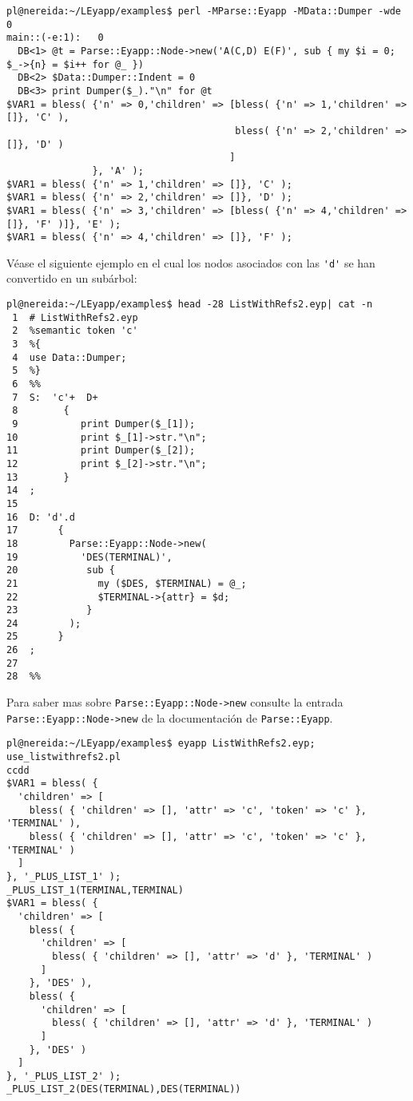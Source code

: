\begin{verbatim}
pl@nereida:~/LEyapp/examples$ perl -MParse::Eyapp -MData::Dumper -wde 0
main::(-e:1):   0
  DB<1> @t = Parse::Eyapp::Node->new('A(C,D) E(F)', sub { my $i = 0; $_->{n} = $i++ for @_ })
  DB<2> $Data::Dumper::Indent = 0
  DB<3> print Dumper($_)."\n" for @t
$VAR1 = bless( {'n' => 0,'children' => [bless( {'n' => 1,'children' => []}, 'C' ),
                                        bless( {'n' => 2,'children' => []}, 'D' )
                                       ]
               }, 'A' );
$VAR1 = bless( {'n' => 1,'children' => []}, 'C' );
$VAR1 = bless( {'n' => 2,'children' => []}, 'D' );
$VAR1 = bless( {'n' => 3,'children' => [bless( {'n' => 4,'children' => []}, 'F' )]}, 'E' );
$VAR1 = bless( {'n' => 4,'children' => []}, 'F' );
\end{verbatim}

Véase el siguiente ejemplo en el cual los nodos asociados con las \verb|'d'| se han convertido 
en un subárbol:
\begin{verbatim}
pl@nereida:~/LEyapp/examples$ head -28 ListWithRefs2.eyp| cat -n
 1  # ListWithRefs2.eyp
 2  %semantic token 'c'
 3  %{
 4  use Data::Dumper;
 5  %}
 6  %%
 7  S:  'c'+  D+
 8        {
 9           print Dumper($_[1]);
10           print $_[1]->str."\n";
11           print Dumper($_[2]);
12           print $_[2]->str."\n";
13        }
14  ;
15
16  D: 'd'.d
17       {
18         Parse::Eyapp::Node->new(
19           'DES(TERMINAL)',
20            sub {
21              my ($DES, $TERMINAL) = @_;
22              $TERMINAL->{attr} = $d;
23            }
24         );
25       }
26  ;
27
28  %%
\end{verbatim}

Para saber mas sobre \verb|Parse::Eyapp::Node->new| consulte la entrada
\verb|Parse::Eyapp::Node->new| de la documentación de \verb|Parse::Eyapp|.

\begin{verbatim}
pl@nereida:~/LEyapp/examples$ eyapp ListWithRefs2.eyp; use_listwithrefs2.pl
ccdd
$VAR1 = bless( {
  'children' => [
    bless( { 'children' => [], 'attr' => 'c', 'token' => 'c' }, 'TERMINAL' ),
    bless( { 'children' => [], 'attr' => 'c', 'token' => 'c' }, 'TERMINAL' )
  ]
}, '_PLUS_LIST_1' );
_PLUS_LIST_1(TERMINAL,TERMINAL)
$VAR1 = bless( {
  'children' => [
    bless( {
      'children' => [
        bless( { 'children' => [], 'attr' => 'd' }, 'TERMINAL' )
      ]
    }, 'DES' ),
    bless( {
      'children' => [
        bless( { 'children' => [], 'attr' => 'd' }, 'TERMINAL' )
      ]
    }, 'DES' )
  ]
}, '_PLUS_LIST_2' );
_PLUS_LIST_2(DES(TERMINAL),DES(TERMINAL))
\end{verbatim}

